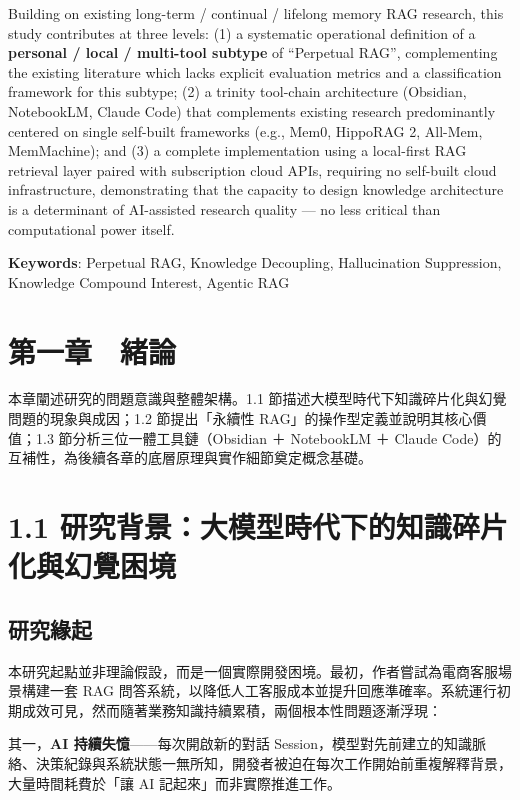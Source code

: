 Building on existing long-term / continual / lifelong memory RAG
research, this study contributes at three levels: (1) a systematic
operational definition of a \textbf{personal / local / multi-tool
subtype} of ``Perpetual RAG'', complementing the existing literature
which lacks explicit evaluation metrics and a classification framework
for this subtype; (2) a trinity tool-chain architecture (Obsidian,
NotebookLM, Claude Code) that complements existing research
predominantly centered on single self-built frameworks (e.g., Mem0,
HippoRAG 2, All-Mem, MemMachine); and (3) a complete implementation
using a local-first RAG retrieval layer paired with subscription cloud
APIs, requiring no self-built cloud infrastructure, demonstrating that
the capacity to design knowledge architecture is a determinant of
AI-assisted research quality --- no less critical than computational
power itself.

\textbf{Keywords}: Perpetual RAG, Knowledge Decoupling, Hallucination
Suppression, Knowledge Compound Interest, Agentic RAG

\chapter{第一章　緒論}\label{ux7b2cux4e00ux7ae0-ux7dd2ux8ad6}

本章闡述研究的問題意識與整體架構。1.1
節描述大模型時代下知識碎片化與幻覺問題的現象與成因；1.2 節提出「永續性
RAG」的操作型定義並說明其核心價值；1.3 節分析三位一體工具鏈（Obsidian ＋
NotebookLM ＋ Claude
Code）的互補性，為後續各章的底層原理與實作細節奠定概念基礎。

\chapter{1.1
研究背景：大模型時代下的知識碎片化與幻覺困境}\label{ux7814ux7a76ux80ccux666fux5927ux6a21ux578bux6642ux4ee3ux4e0bux7684ux77e5ux8b58ux788eux7247ux5316ux8207ux5e7bux89baux56f0ux5883}

\section{研究緣起}\label{ux7814ux7a76ux7de3ux8d77}

本研究起點並非理論假設，而是一個實際開發困境。最初，作者嘗試為電商客服場景構建一套
RAG
問答系統，以降低人工客服成本並提升回應準確率。系統運行初期成效可見，然而隨著業務知識持續累積，兩個根本性問題逐漸浮現：

其一，\textbf{AI 持續失憶}------每次開啟新的對話
Session，模型對先前建立的知識脈絡、決策紀錄與系統狀態一無所知，開發者被迫在每次工作開始前重複解釋背景，大量時間耗費於「讓
AI 記起來」而非實際推進工作。


